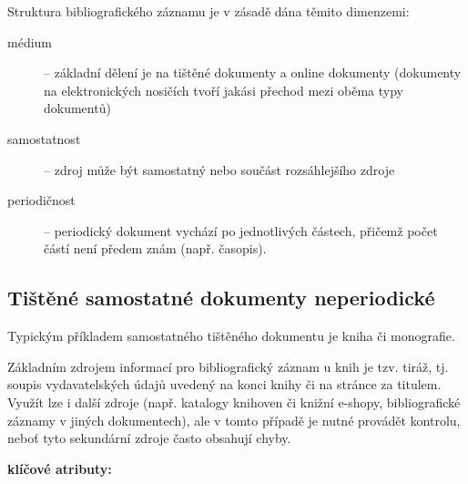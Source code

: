 \documentclass[male,czech,api_bc]{kitheses}
\begin{document}
Struktura bibliografického záznamu je v zásadě dána těmito dimenzemi:

\begin{description}
\item[médium] -- základní dělení je na tištěné dokumenty a online dokumenty (dokumenty na elektronických nosičích tvoří jakási přechod mezi oběma typy dokumentů)
\item[samostatnost] -- zdroj může být samostatný nebo součást rozsáhlejšího zdroje
\item[periodičnost] -- periodický dokument vychází po jednotlivých částech, přičemž počet částí není předem znám (např. časopis).  
\end{description}

\subsection{Tištěné samostatné dokumenty neperiodické}

Typickým příkladem samostatného tištěného dokumentu je kniha či monografie.

Základním zdrojem informací pro bibliografický záznam u knih je tzv. tiráž, tj. soupis vydavatelských údajů uvedený na konci knihy či na stránce za titulem. Využít lze i další zdroje (např. katalogy knihoven či knižní e-shopy, bibliografické záznamy v jiných dokumentech), ale v tomto případě je nutné provádět kontrolu, neboť tyto sekundární zdroje často obsahují chyby.

\textbf{klíčové atributy:}
\end{document}
